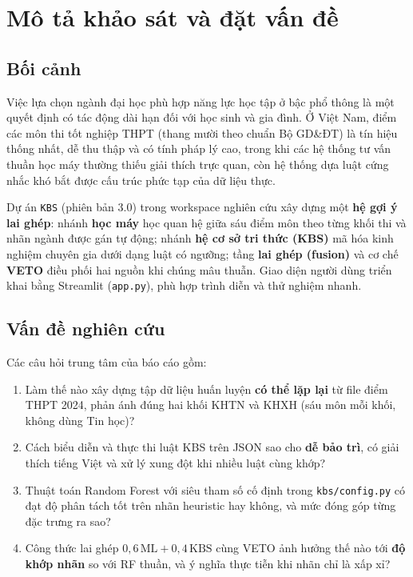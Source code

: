 \chapter{Mô tả khảo sát và đặt vấn đề}

\section{Bối cảnh}
Việc lựa chọn ngành đại học phù hợp năng lực học tập ở bậc phổ thông là một quyết định có tác động dài hạn đối với học sinh và gia đình. Ở Việt Nam, điểm các môn thi tốt nghiệp THPT (thang mười theo chuẩn Bộ GD\&ĐT) là tín hiệu thống nhất, dễ thu thập và có tính pháp lý cao, trong khi các hệ thống tư vấn thuần học máy thường thiếu giải thích trực quan, còn hệ thống dựa luật cứng nhắc khó bắt được cấu trúc phức tạp của dữ liệu thực.

Dự án \texttt{KBS} (phiên bản 3.0) trong workspace nghiên cứu xây dựng một \textbf{hệ gợi ý lai ghép}: nhánh \textbf{học máy} học quan hệ giữa sáu điểm môn theo từng khối thi và nhãn ngành được gán tự động; nhánh \textbf{hệ cơ sở tri thức (KBS)} mã hóa kinh nghiệm chuyên gia dưới dạng luật có ngưỡng; tầng \textbf{lai ghép (fusion)} và cơ chế \textbf{VETO} điều phối hai nguồn khi chúng mâu thuẫn. Giao diện người dùng triển khai bằng Streamlit (\texttt{app.py}), phù hợp trình diễn và thử nghiệm nhanh.

\section{Vấn đề nghiên cứu}
Các câu hỏi trung tâm của báo cáo gồm:
\begin{enumerate}[leftmargin=*]
  \item Làm thế nào xây dựng tập dữ liệu huấn luyện \textbf{có thể lặp lại} từ file điểm THPT 2024, phản ánh đúng hai khối KHTN và KHXH (sáu môn mỗi khối, không dùng Tin học)?
  \item Cách biểu diễn và thực thi luật KBS trên JSON sao cho \textbf{dễ bảo trì}, có giải thích tiếng Việt và xử lý xung đột khi nhiều luật cùng khớp?
  \item Thuật toán Random Forest với siêu tham số cố định trong \texttt{kbs/config.py} có đạt độ phân tách tốt trên nhãn heuristic hay không, và mức đóng góp từng đặc trưng ra sao?
  \item Công thức lai ghép $0{,}6\,\text{ML} + 0{,}4\,\text{KBS}$ cùng VETO ảnh hưởng thế nào tới \textbf{độ khớp nhãn} so với RF thuần, và ý nghĩa thực tiễn khi nhãn chỉ là xấp xỉ?
\end{enumerate}

